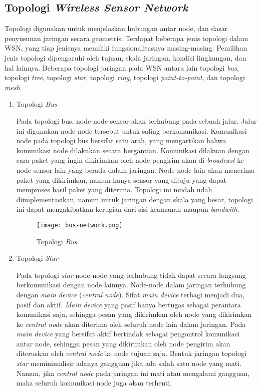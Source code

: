 \subsection{Topologi \textit{Wireless Sensor Network}} \label{Topologi WSN}
Topologi digunakan untuk menjelaskan hubungan antar node, dan dasar penyusunan jaringan secara geometris. Terdapat beberapa jenis topologi dalam WSN, yang tiap jenisnya memiliki fungsionalitasnya masing-masing. Pemilihan jenis topologi dipengaruhi oleh tujuan, skala jaringan, kondisi lingkungan, dan hal lainnya. Beberapa topologi jaringan pada WSN antara lain topologi \textit{bus}, topologi \textit{tree}, topologi \textit{star}, topologi \textit{ring}, topologi \textit{point-to-point}, dan topologi \textit{mesh}.
\begin{enumerate}
    \item Topologi \textit{Bus}
    
    Pada topologi bus, node-node sensor akan terhubung pada sebuah jalur. Jalur ini digunakan node-node tersebut untuk saling berkomunikasi. Komunikasi node pada topologi bus bersifat satu arah, yang mengartikan bahwa komunikasi node dilakukan secara bergantian. Komunikasi dilakuan dengan cara paket yang ingin dikirimkan oleh node pengirim akan di-\textit{broadcast} ke node sensor lain yang berada dalam jaringan. Node-node lain akan menerima paket yang dikirimkan, namun hanya sensor yang dituju yang dapat memproses hasil paket yang diterima. Topologi ini mudah udah diimplementasikan, namun untuk jaringan dengan skala yang besar, topologi ini dapat mengakibatkan kerugian dari sisi keamanan maupun \textit{bandwith}. 
    
    \begin{figure}[H]
    	\centering  
    	\texttt{[image: bus-network.png]}  
    	\caption[Topologi \textit{Bus}]{Topologi \textit{Bus}}
    	\label{fig:Topologi Bus} 
    \end{figure} 
    
    \item Topologi \textit{Star}
    
    Pada topologi \textit{star} node-node yang terhubung tidak dapat secara langsung berkomunikasi dengan node lainnya. Node-node dalam jaringan terhubung dengan \textit{main device} (\textit{central node}). Sifat \textit{main device} terbagi menjadi dua, pasif dan aktif. \textit{Main device} yang pasif hanya bertugas sebagai perantara komunikasi saja, sehingga pesan yang dikirimkan oleh node yang dikirimkan ke \textit{central node } akan diterima oleh seluruh node lain dalam jaringan. Pada \textit{main device} yang bersifat aktif bertindak sebagai pengontrol komunikasi antar node, sehingga pesan yang dikirimkan oleh node pengirim akan diteruskan oleh \textit{central node} ke node tujuan saja. Bentuk jaringan topologi \textit{star} meminimalisir adanya gangguan jika ada salah satu node yang mati. Namun, jika \textit{central node} pada jaringan ini mati atau mengalami gangguan, maka seluruh komunikasi node juga akan terhenti.
    

\end{enumerate}
